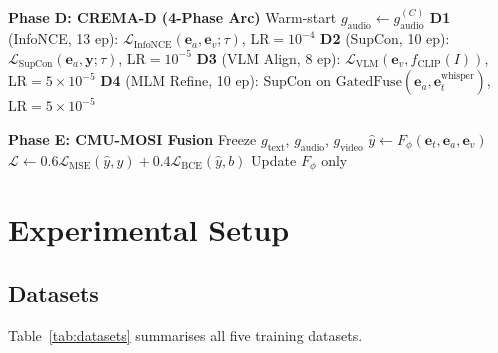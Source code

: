 \documentclass[10pt,conference]{IEEEtran}
\theoremstyle{ieeethm}
\theoremstyle{ieeedef}
\theoremstyle{ieeeremark}
\begin{document}
\begin{algorithm}[!t]
\begin{algorithmic}[1]
\Statex \textbf{Phase D: CREMA-D (4-Phase Arc)}
\State Warm-start $g_\text{audio} \leftarrow g_\text{audio}^{(C)}$
\State \textbf{D1} (InfoNCE, 13 ep): $\mathcal{L}_\text{InfoNCE}(\mathbf{e}_a,\mathbf{e}_v;\tau)$, LR$=10^{-4}$
\State \textbf{D2} (SupCon, 10 ep): $\mathcal{L}_\text{SupCon}(\mathbf{e}_a,\mathbf{y};\tau)$, LR$=10^{-5}$
\State \textbf{D3} (VLM Align, 8 ep): $\mathcal{L}_\text{VLM}(\mathbf{e}_v,f_\text{CLIP}(I))$, LR$=5{\times}10^{-5}$
\State \textbf{D4} (MLM Refine, 10 ep): SupCon on $\text{GatedFuse}(\mathbf{e}_a,\mathbf{e}_t^\text{whisper})$, LR$=5{\times}10^{-5}$

\Statex \textbf{Phase E: CMU-MOSI Fusion}
\State Freeze $g_\text{text}$, $g_\text{audio}$, $g_\text{video}$
    \State $\hat{y} \gets F_\phi(\mathbf{e}_t,\mathbf{e}_a,\mathbf{e}_v)$
    \State $\mathcal{L} \gets 0.6\mathcal{L}_\text{MSE}(\hat{y},y) + 0.4\mathcal{L}_\text{BCE}(\hat{y},b)$
    \State Update $F_\phi$ only
  \EndFor
\EndFor
\end{algorithmic}
\end{algorithm}

\section{Experimental Setup}
\label{sec:experiments}

\subsection{Datasets}

Table~\ref{tab:datasets} summarises all five training datasets.

\begin{table}[!t]
\centering
\caption{Dataset Summary}
\label{tab:datasets}
\end{table}
\end{document}
